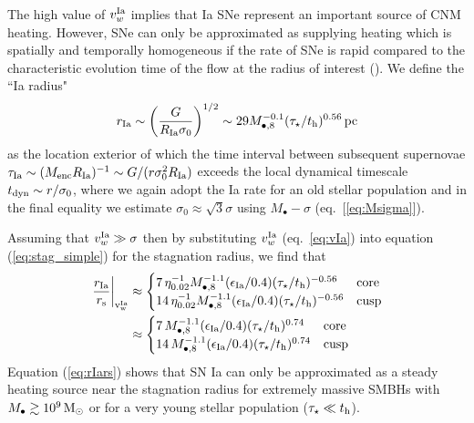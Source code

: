 \documentclass[usenatbib,fleqn]{mn2e}
\begin{document}
The high value of $v_{w}^{\rm Ia}$ implies that Ia SNe represent an
important source of CNM heating.  However, SNe can only be
approximated as supplying heating which is spatially and temporally
homogeneous if the rate of SNe is rapid compared to the characteristic
evolution time of the flow at the radius of interest
(\citealt{ShcherbakovWong+:2014a}).  We define the ``Ia radius"
  \begin{align}
    r_{\rm Ia} \sim \left(\frac{G}{R_{\rm Ia}\sigma_0}\right)^{1/2} \sim
    29 M_{\bullet,8}^{-0.1}(\tau_{\star}/t_{\rm h})^{0.56}\,{\rm pc}
    \label{eq:rIa}
  \end{align}
  as the location exterior of which the time interval between
  subsequent supernovae $\tau_{\rm Ia} \sim (M_{\rm enc}R_{\rm
    Ia})^{-1} \sim G/(r\sigma_0^{2}R_{\rm Ia})$ exceeds the local
  dynamical timescale $t_{\rm dyn} \sim r/\sigma_0$, where we again
  adopt the Ia rate for an old stellar population and in the final
  equality we estimate $\sigma_0 \approx \sqrt{3}\sigma$ using $M_{\bullet}-\sigma$ (eq.~[\ref{eq:Msigma}]).

Assuming that $v_{w}^{\rm Ia} \gg \sigma$ then by substituting
$v_{w}^{\rm Ia}$ (eq.~\ref{eq:vIa}) into equation (\ref{eq:stag_simple})
for the stagnation radius, we find that
\begin{align}
  \left.\frac{r_{\rm Ia}}{r_{\rm s}}\right|_{\rm v_{w}^{\rm Ia}}&\approx
  \begin{cases}
    7\, \eta_{0.02}^{-1} M_{\bullet,8}^{-1.1}(\epsilon_{\rm
     Ia}/0.4) (\tau_{\star}/t_{\rm h})^{-0.56}  & {\rm core}\\
    14\, \eta_{0.02}^{-1} M_{\bullet,8}^{-1.1}(\epsilon_{\rm
     Ia}/0.4) (\tau_{\star}/t_{\rm h})^{-0.56} &{\rm cusp}\\
   \end{cases} \nonumber\\
 &\approx 
 \begin{cases}
    7\, M_{\bullet,8}^{-1.1}(\epsilon_{\rm
     Ia}/0.4) (\tau_{\star}/t_{\rm h})^{0.74}  & {\rm core}\\
    14\, M_{\bullet,8}^{-1.1}(\epsilon_{\rm
     Ia}/0.4) (\tau_{\star}/t_{\rm h})^{0.74} &{\rm cusp}\\
   \end{cases}
\label{eq:rIars}
\end{align}
Equation (\ref{eq:rIars}) shows that SN Ia can only be approximated as
a steady heating source near the stagnation radius for extremely
massive SMBHs with $M_{\bullet} \gtrsim 10^9 \,{\rm M_\odot}$ or for a very
young stellar population ($\tau_{\star} \ll t_{\rm h}$).
\end{document}
